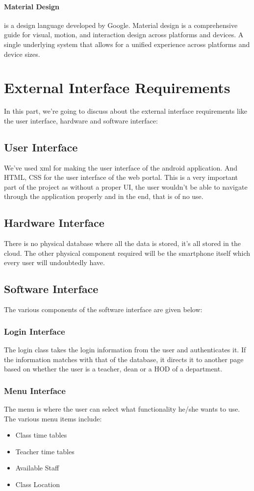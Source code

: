 \documentclass[BTech]{srmuthesis}
\begin{document}
\paragraph{Material Design} is a design language developed by Google. Material design is a comprehensive guide for visual, motion, and interaction design across platforms and devices. A single underlying system that allows for a unified experience across platforms and device sizes.
\section{External Interface Requirements}
In this part, we're going to discuss about the external interface requirements like the user interface, hardware and software interface:
\subsection{User Interface}
We've used xml for making the user interface of the android application. And HTML, CSS for the user interface of the web portal. This is a very important part of the project as without a proper UI, the user wouldn't be able to navigate through the application properly and in the end, that is of no use.
\subsection{Hardware Interface}
There is no physical database where all the data is stored, it's all stored in the cloud. The other physical component required will be the smartphone itself which every user will undoubtedly have.
\subsection{Software Interface}
The various components of the software interface are given below:
\subsubsection{Login Interface}
The login class takes the login information from the user and authenticates it. If the information matches with that of the database, it directs it to another page based on whether the user is a teacher, dean or a HOD of a department.                          
\subsubsection{Menu Interface}
The menu is where the user can select what functionality he/she wants to use. The various menu items include:
\begin{itemize}
\item Class time tables
\item Teacher time tables
\item Available Staff
\item Class Location
\end{itemize}
\end{document}
